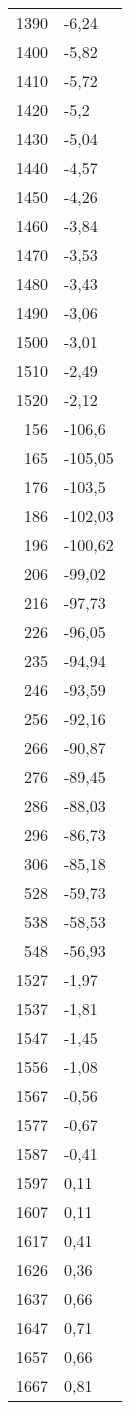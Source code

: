 \begin{table}
\begin{tabular}{rl}
1390	&	-6,24\\
1400	&	-5,82\\
1410	&	-5,72\\
1420	&	-5,2\\
1430	&	-5,04\\
1440	&	-4,57\\
1450	&	-4,26\\
1460	&	-3,84\\
1470	&	-3,53\\
1480	&	-3,43\\
1490	&	-3,06\\
1500	&	-3,01\\
1510	&	-2,49\\
1520	&	-2,12\\
156	&	-106,6\\
165	&	-105,05\\
176	&	-103,5\\
186	&	-102,03\\
196	&	-100,62\\
206	&	-99,02\\
216	&	-97,73\\
226	&	-96,05\\
235	&	-94,94\\
246	&	-93,59\\
256	&	-92,16\\
266	&	-90,87\\
276	&	-89,45\\
286	&	-88,03\\
296	&	-86,73\\
306	&	-85,18\\
528	&	-59,73\\
538	&	-58,53\\
548	&	-56,93\\
1527	&	-1,97\\
1537	&	-1,81\\
1547	&	-1,45\\
1556	&	-1,08\\
1567	&	-0,56\\
1577	&	-0,67\\
1587	&	-0,41\\
1597	&	0,11\\
1607	&	0,11\\
1617	&	0,41\\
1626	&	0,36\\
1637	&	0,66\\
1647	&	0,71\\
1657	&	0,66\\
1667	&	0,81\\

\end{tabular}
\end{table}
